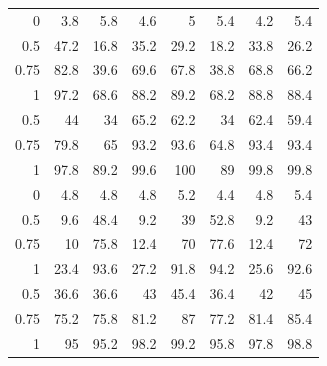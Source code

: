 \begin{tabular}{rrrrrrrr}
0 & 3.8 & 5.8 & 4.6 & 5 & 5.4 & 4.2 & 5.4 \\
0.5 & 47.2 & 16.8 & 35.2 & 29.2 & 18.2 & 33.8 & 26.2 \\
0.75 & 82.8 & 39.6 & 69.6 & 67.8 & 38.8 & 68.8 & 66.2 \\
1 & 97.2 & 68.6 & 88.2 & 89.2 & 68.2 & 88.8 & 88.4 \\
0.5 & 44 & 34 & 65.2 & 62.2 & 34 & 62.4 & 59.4 \\
0.75 & 79.8 & 65 & 93.2 & 93.6 & 64.8 & 93.4 & 93.4 \\
1 & 97.8 & 89.2 & 99.6 & 100 & 89 & 99.8 & 99.8 \\
0 & 4.8 & 4.8 & 4.8 & 5.2 & 4.4 & 4.8 & 5.4 \\
0.5 & 9.6 & 48.4 & 9.2 & 39 & 52.8 & 9.2 & 43 \\
0.75 & 10 & 75.8 & 12.4 & 70 & 77.6 & 12.4 & 72 \\
1 & 23.4 & 93.6 & 27.2 & 91.8 & 94.2 & 25.6 & 92.6 \\
0.5 & 36.6 & 36.6 & 43 & 45.4 & 36.4 & 42 & 45 \\
0.75 & 75.2 & 75.8 & 81.2 & 87 & 77.2 & 81.4 & 85.4 \\
1 & 95 & 95.2 & 98.2 & 99.2 & 95.8 & 97.8 & 98.8 \\
\end{tabular}
